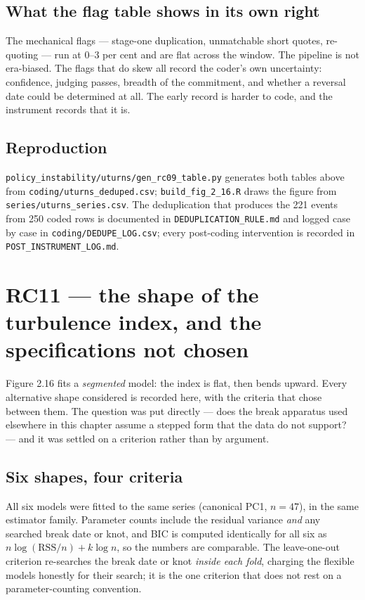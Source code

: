 \subsection*{What the flag table shows in its own right}

The mechanical flags --- stage-one duplication, unmatchable short quotes, re-quoting --- run at
0--3 per cent and are flat across the window. The pipeline is not era-biased. The flags that do skew
all record the coder's own uncertainty: confidence, judging passes, breadth of the commitment, and
whether a reversal date could be determined at all. The early record is harder to code, and the
instrument records that it is.

\subsection*{Reproduction}

\texttt{policy\_instability/uturns/}\allowbreak\texttt{gen\_rc09\_table.py} generates both tables above from
\texttt{coding/uturns\_deduped.csv}; \texttt{build\_fig\_2\_16.R} draws the figure from
\texttt{series/uturns\_series.csv}. The deduplication that produces the 221 events from 250 coded
rows is documented in \texttt{DEDUPLICATION\_RULE.md} and logged case by case in
\texttt{coding/DEDUPE\_LOG.csv}; every post-coding intervention is recorded in
\texttt{POST\_INSTRUMENT\_LOG.md}.

\section{RC11 --- the shape of the turbulence index, and the specifications not chosen}

Figure 2.16 fits a \emph{segmented} model: the index is flat, then bends upward. Every alternative
shape considered is recorded here, with the criteria that chose between them. The question was put
directly --- does the break apparatus used elsewhere in this chapter assume a stepped form that the
data do not support? --- and it was settled on a criterion rather than by argument.

\subsection*{Six shapes, four criteria}

All six models were fitted to the same series (canonical PC1, $n=47$), in the same estimator family.
Parameter counts include the residual variance \emph{and} any searched break date or knot, and BIC
is computed identically for all six as $n\log(\mathrm{RSS}/n)+k\log n$, so the numbers are
comparable. The leave-one-out criterion re-searches the break date or knot \emph{inside each fold},
charging the flexible models honestly for their search; it is the one criterion that does not rest
on a parameter-counting convention.

